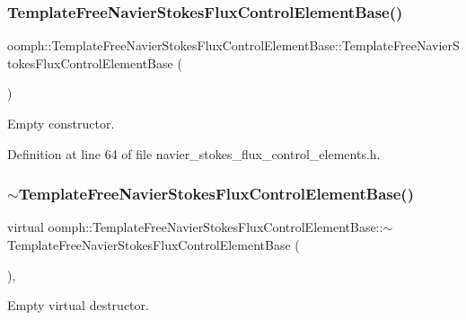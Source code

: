 \subsubsection{\texorpdfstring{Template\+Free\+Navier\+Stokes\+Flux\+Control\+Element\+Base()}{TemplateFreeNavierStokesFluxControlElementBase()}}
{\footnotesize\ttfamily oomph\+::\+Template\+Free\+Navier\+Stokes\+Flux\+Control\+Element\+Base\+::\+Template\+Free\+Navier\+Stokes\+Flux\+Control\+Element\+Base (\begin{DoxyParamCaption}{ }\end{DoxyParamCaption})\hspace{0.3cm}{\ttfamily [inline]}}



Empty constructor. 



Definition at line 64 of file navier\+\_\+stokes\+\_\+flux\+\_\+control\+\_\+elements.\+h.

\mbox{\label{classoomph_1_1TemplateFreeNavierStokesFluxControlElementBase_a42ebf77b9062c9eb84236e03f9f6ad3d}} 
\subsubsection{\texorpdfstring{$\sim$\+Template\+Free\+Navier\+Stokes\+Flux\+Control\+Element\+Base()}{~TemplateFreeNavierStokesFluxControlElementBase()}}
{\footnotesize\ttfamily virtual oomph\+::\+Template\+Free\+Navier\+Stokes\+Flux\+Control\+Element\+Base\+::$\sim$\+Template\+Free\+Navier\+Stokes\+Flux\+Control\+Element\+Base (\begin{DoxyParamCaption}{ }\end{DoxyParamCaption})\hspace{0.3cm}{\ttfamily [inline]}, {\ttfamily [virtual]}}



Empty virtual destructor. 



